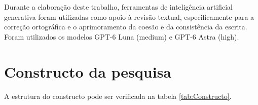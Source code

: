 Durante a elaboração deste trabalho, ferramentas de inteligência artificial generativa foram utilizadas como apoio à revisão textual, especificamente para a correção ortográfica e o aprimoramento da coesão e da consistência da escrita. Foram utilizados os modelos GPT-6 Luna (medium) e GPT-6 Astra (high).

\section{Constructo da pesquisa}
A estrutura do constructo pode ser verificada na tabela \ref{tab:Constructo}.
